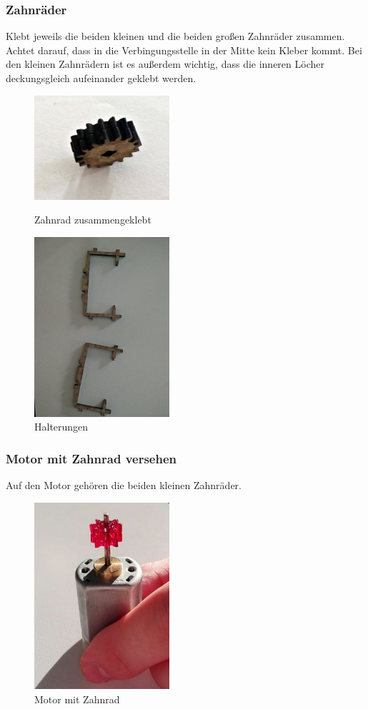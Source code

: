 \documentclass[12pt,a4paper]{article}
\begin{document}
\subsubsection{Zahnräder}
Klebt jeweils die beiden kleinen und die beiden großen Zahnräder zusammen. Achtet darauf, dass in die Verbingungsstelle in der Mitte kein Kleber kommt.
Bei den kleinen Zahnrädern ist es außerdem wichtig, dass die inneren Löcher deckungsgleich aufeinander geklebt werden.
\begin{figure}[ht]
	\begin{minipage}{0.5\textwidth}
		\includegraphics[width=5cm]{./graphics/zahnrad}
		\caption{Zahnrad zusammengeklebt}
	\end{minipage}
	\begin{minipage}{0.5\textwidth}
		\includegraphics[width=5cm]{./graphics/halterungen.jpg}
		\caption{Halterungen}
	\end{minipage}
\end{figure}

\subsubsection{Motor mit Zahnrad versehen}
Auf den Motor gehören die beiden kleinen Zahnräder.
\begin{figure}[ht]
	\begin{minipage}{0.33\textwidth}
	 \includegraphics[width=5cm]{./graphics/motor_zahnrad.jpg}
	\caption{Motor mit Zahnrad}
	\end{minipage}
\end{figure}
		
\end{document}
